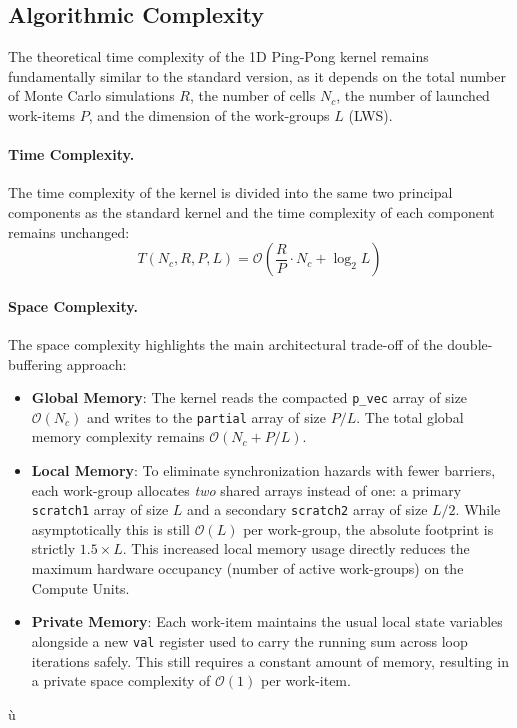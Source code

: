 \subsection{Algorithmic Complexity}\label{subsec:algorithmic_complexity_pingpong}
The theoretical time complexity of the 1D Ping-Pong kernel remains fundamentally similar to the standard version, as it depends on the total number of Monte Carlo simulations $R$, the number of cells $N_c$, the number of launched work-items $P$, and the dimension of the work-groups $L$ (LWS). 

\paragraph{Time Complexity.}
The time complexity of the kernel is divided into the same two principal components as the standard kernel and the time complexity of each component remains unchanged:
\begin{equation}
    T(N_c, R, P, L) = \mathcal{O}\left(\frac{R}{P} \cdot N_c + \log_2 L\right)
\label{eq:pingpong_kernel_time_complexity}
\end{equation}

\paragraph{Space Complexity.}
The space complexity highlights the main architectural trade-off of the double-buffering approach:
\begin{itemize}
    \item \textbf{Global Memory}: The kernel reads the compacted \texttt{p\_vec} array of size $\mathcal{O}(N_c)$ and writes to the \texttt{partial} array of size $P/L$. The total global memory complexity remains $\mathcal{O}(N_c + P/L)$.
    
    \item \textbf{Local Memory}: To eliminate synchronization hazards with fewer barriers, each work-group allocates \textit{two} shared arrays instead of one: a primary \texttt{scratch1} array of size $L$ and a secondary \texttt{scratch2} array of size $L/2$. While asymptotically this is still $\mathcal{O}(L)$ per work-group, the absolute footprint is strictly $1.5 \times L$. This increased local memory usage directly reduces the maximum hardware occupancy (number of active work-groups) on the Compute Units.
    
    \item \textbf{Private Memory}: Each work-item maintains the usual local state variables alongside a new \texttt{val} register used to carry the running sum across loop iterations safely. This still requires a constant amount of memory, resulting in a private space complexity of $\mathcal{O}(1)$ per work-item.
\end{itemize}ù

